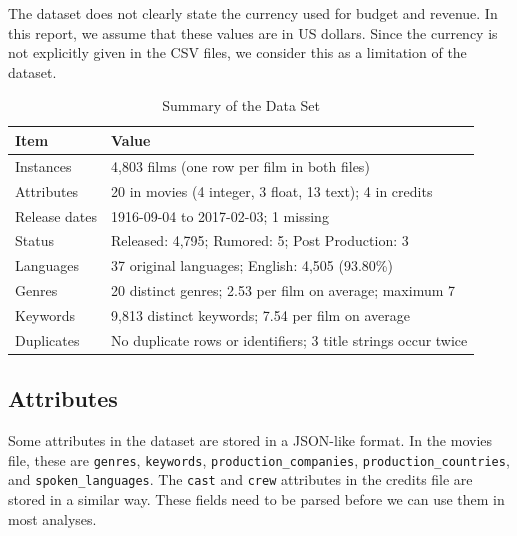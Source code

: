 \documentclass[conference]{IEEEtran}
\begin{document}
The dataset does not clearly state the currency used for budget
and revenue. In this report, we assume that these values are in
US dollars. Since the currency is not explicitly given in the
CSV files, we consider this as a limitation of the dataset.

\begin{table}[t]
\caption{Summary of the Data Set}
\label{tab:summary}
\centering
\footnotesize
\begin{tabular}{p{}p{}}
\toprule
Item & Value \\
\midrule
Instances & 4,803 films (one row per film in both files) \\
Attributes & 20 in movies (4 integer, 3 float, 13 text); 4 in credits \\
Release dates & 1916-09-04 to 2017-02-03; 1 missing \\
Status & Released: 4,795; Rumored: 5; Post Production: 3 \\
Languages & 37 original languages; English: 4,505 (93.80\%) \\
Genres & 20 distinct genres; 2.53 per film on average; maximum 7 \\
Keywords & 9,813 distinct keywords; 7.54 per film on average \\
Duplicates & No duplicate rows or identifiers; 3 title strings occur twice \\
\bottomrule
\end{tabular}
\end{table}

\subsection{Attributes}
Some attributes in the dataset are stored in a JSON-like format.
In the movies file, these are \texttt{genres}, \texttt{keywords},
\texttt{production\_companies}, \texttt{production\_countries},
and \texttt{spoken\_languages}. The \texttt{cast} and \texttt{crew}
attributes in the credits file are stored in a similar way.
These fields need to be parsed before we can use them in most analyses.
\end{document}
